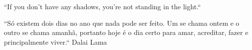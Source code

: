 \begin{commentA}
``If you don't have any shadows, you're not standing in the light.``
\end{commentA}
\begin{commentB}
“Só existem dois dias no ano que nada pode ser feito.
Um se chama ontem e o outro se chama amanhã, portanto
hoje é o dia certo para amar, acreditar, fazer e principalmente
viver.“
\hfill \faHamsa Dalai Lama
\end{commentB}
\begin{commentC}
%
\end{commentC}
\begin{commentD}
%
\end{commentD}
\begin{commentE}
%
\end{commentE}
\begin{commentF}
%
\end{commentF}
\begin{commentG}
%
\end{commentG}
\begin{commentH}
%
\end{commentH}
\begin{commentI}
%
\end{commentI}

